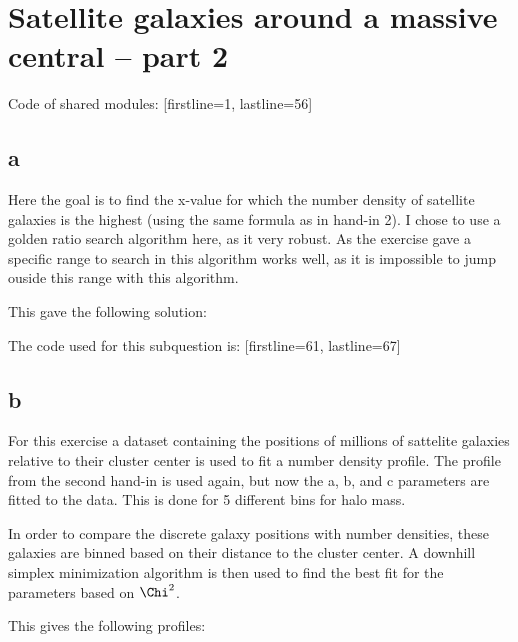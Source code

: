 \section{Satellite galaxies around a massive central – part 2}
Code of shared modules:
[firstline=1, lastline=56]

\subsection*{a}
Here the goal is to find the x-value for which the number density of satellite galaxies is the highest (using the same formula as in hand-in 2).
I chose to use a golden ratio search algorithm here, as it very robust.
As the exercise gave a specific range to search in this algorithm works well, as it is impossible to jump ouside this range with this algorithm.

This gave the following solution:


The code used for this subquestion is:
[firstline=61, lastline=67]

\subsection*{b}
For this exercise a dataset containing the positions of millions of sattelite galaxies relative to their cluster center is used to fit a number density profile.
The profile from the second hand-in is used again, but now the a, b, and c parameters are fitted to the data.
This is done for 5 different bins for halo mass.

In order to compare the discrete galaxy positions with number densities, these galaxies are binned based on their distance to the cluster center.
A downhill simplex minimization algorithm is then used to find the best fit for the parameters based on $\Chi^2$.

This gives the following profiles:


